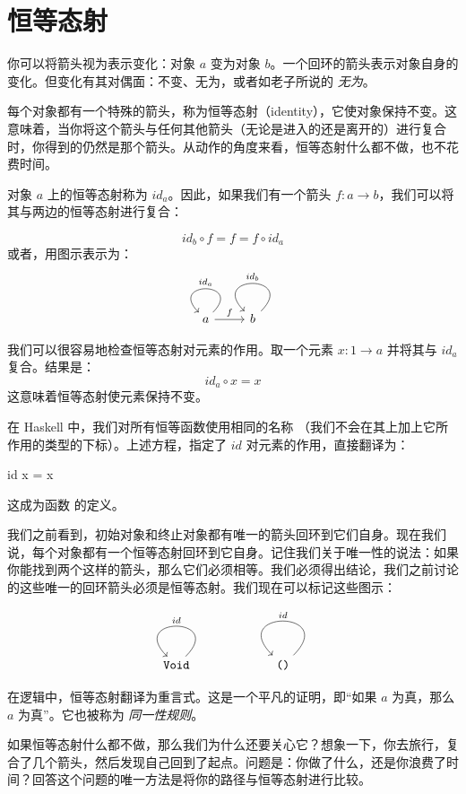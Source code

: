 \documentclass[DaoFP]{subfiles}
\begin{document}
\section{恒等态射}

你可以将箭头视为表示变化：对象 $a$ 变为对象 $b$。一个回环的箭头表示对象自身的变化。但变化有其对偶面：不变、无为，或者如老子所说的 \emph{无为}。

每个对象都有一个特殊的箭头，称为恒等态射（identity），它使对象保持不变。这意味着，当你将这个箭头与任何其他箭头（无论是进入的还是离开的）进行复合时，你得到的仍然是那个箭头。从动作的角度来看，恒等态射什么都不做，也不花费时间。

对象 $a$ 上的恒等态射称为 $id_a$。因此，如果我们有一个箭头 $f \colon a \to b$，我们可以将其与两边的恒等态射进行复合：

\[id_b \circ f = f = f \circ id_a \]
或者，用图示表示为：
\[
 \begin{tikzcd}
 a
 \arrow[loop, "id_a"']
 \arrow[r, "f"]
 & b
 \arrow[loop, "id_b"']
 \end{tikzcd}
\]

我们可以很容易地检查恒等态射对元素的作用。取一个元素 $x \colon 1 \to a$ 并将其与 $id_a$ 复合。结果是：
\[id_a \circ x = x\]
这意味着恒等态射使元素保持不变。

在 Haskell 中，我们对所有恒等函数使用相同的名称 （我们不会在其上加上它所作用的类型的下标）。上述方程，指定了 $id$ 对元素的作用，直接翻译为：
\begin{haskell}
id x = x
\end{haskell}
这成为函数  的定义。

我们之前看到，初始对象和终止对象都有唯一的箭头回环到它们自身。现在我们说，每个对象都有一个恒等态射回环到它自身。记住我们关于唯一性的说法：如果你能找到两个这样的箭头，那么它们必须相等。我们必须得出结论，我们之前讨论的这些唯一的回环箭头必须是恒等态射。我们现在可以标记这些图示：

\[
 \begin{tikzcd}
 \hask{Void}
 \arrow[loop, "id"']
 \end{tikzcd}
 \begin{tikzcd}
 \hask{()}
 \arrow[loop, "id"']
 \end{tikzcd}
\]

在逻辑中，恒等态射翻译为重言式。这是一个平凡的证明，即“如果 $a$ 为真，那么 $a$ 为真”。它也被称为 \emph{同一性规则}。

如果恒等态射什么都不做，那么我们为什么还要关心它？想象一下，你去旅行，复合了几个箭头，然后发现自己回到了起点。问题是：你做了什么，还是你浪费了时间？回答这个问题的唯一方法是将你的路径与恒等态射进行比较。
\end{document}

